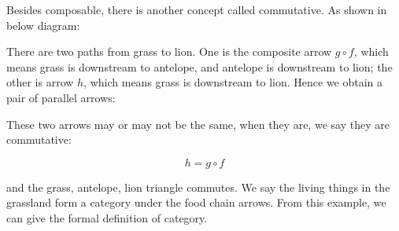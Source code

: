 \documentclass[b5paper]{article}
\begin{document}
Besides composable, there is another concept called commutative. As shown in below diagram:

\begin{center}
\end{center}

There are two paths from grass to lion. One is the composite arrow $g \circ f$, which means grass is downstream to antelope, and antelope is downstream to lion; the other is arrow $h$, which means grass is downstream to lion. Hence we obtain a pair of parallel arrows:

\begin{center}
\end{center}

These two arrows may or may not be the same, when they are, we say they are commutative:

\[
h = g \circ f
\]

and the grass, antelope, lion triangle commutes. We say the living things in the grassland form a category under the food chain arrows. From this example, we can  give the formal definition of category.
\end{document}
